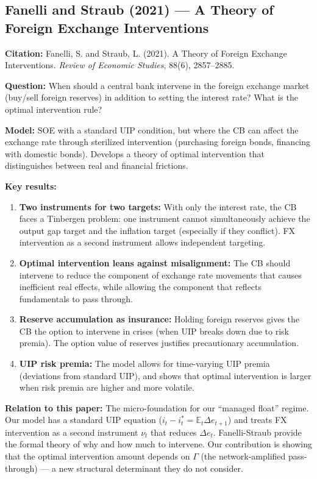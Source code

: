 \documentclass[12pt]{article}
\begin{document}
\subsection{Fanelli and Straub (2021) --- A Theory of Foreign Exchange Interventions}

\textbf{Citation:} Fanelli, S. and Straub, L. (2021). A Theory of Foreign Exchange Interventions. \textit{Review of Economic Studies}, 88(6), 2857--2885.

\textbf{Question:} When should a central bank intervene in the foreign exchange market (buy/sell foreign reserves) in addition to setting the interest rate? What is the optimal intervention rule?

\textbf{Model:} SOE with a standard UIP condition, but where the CB can affect the exchange rate through sterilized intervention (purchasing foreign bonds, financing with domestic bonds). Develops a theory of optimal intervention that distinguishes between real and financial frictions.

\textbf{Key results:}
\begin{enumerate}
    \item \textbf{Two instruments for two targets:} With only the interest rate, the CB faces a Tinbergen problem: one instrument cannot simultaneously achieve the output gap target and the inflation target (especially if they conflict). FX intervention as a second instrument allows independent targeting.
    \item \textbf{Optimal intervention leans against misalignment:} The CB should intervene to reduce the component of exchange rate movements that causes inefficient real effects, while allowing the component that reflects fundamentals to pass through.
    \item \textbf{Reserve accumulation as insurance:} Holding foreign reserves gives the CB the option to intervene in crises (when UIP breaks down due to risk premia). The option value of reserves justifies precautionary accumulation.
    \item \textbf{UIP risk premia:} The model allows for time-varying UIP premia (deviations from standard UIP), and shows that optimal intervention is larger when risk premia are higher and more volatile.
\end{enumerate}

\textbf{Relation to this paper:} The micro-foundation for our ``managed float'' regime. Our model has a standard UIP equation ($i_t - i_t^* = \mathbb{E}_t\Delta e_{t+1}$) and treats FX intervention as a second instrument $\nu_t$ that reduces $\Delta e_t$. Fanelli-Straub provide the formal theory of why and how much to intervene. Our contribution is showing that the optimal intervention amount depends on $\Gamma$ (the network-amplified pass-through) --- a new structural determinant they do not consider.
\end{document}
